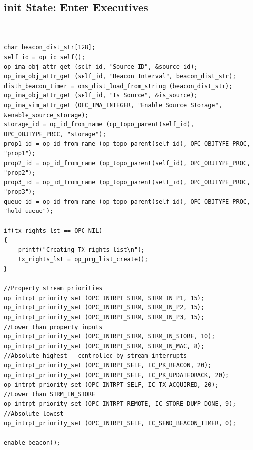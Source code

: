 \subsection{init State: Enter Executives}
{\tiny
\begin{verbatim}


char beacon_dist_str[128];
self_id = op_id_self();
op_ima_obj_attr_get (self_id, "Source ID", &source_id);
op_ima_obj_attr_get (self_id, "Beacon Interval", beacon_dist_str);
disth_beacon_timer = oms_dist_load_from_string (beacon_dist_str);
op_ima_obj_attr_get (self_id, "Is Source", &is_source);
op_ima_sim_attr_get (OPC_IMA_INTEGER, "Enable Source Storage", &enable_source_storage);
storage_id = op_id_from_name (op_topo_parent(self_id), OPC_OBJTYPE_PROC, "storage");
prop1_id = op_id_from_name (op_topo_parent(self_id), OPC_OBJTYPE_PROC, "prop1");
prop2_id = op_id_from_name (op_topo_parent(self_id), OPC_OBJTYPE_PROC, "prop2");
prop3_id = op_id_from_name (op_topo_parent(self_id), OPC_OBJTYPE_PROC, "prop3");
queue_id = op_id_from_name (op_topo_parent(self_id), OPC_OBJTYPE_PROC, "hold_queue");

if(tx_rights_lst == OPC_NIL)
{
	printf("Creating TX rights list\n");
	tx_rights_lst = op_prg_list_create();
}

//Property stream priorities
op_intrpt_priority_set (OPC_INTRPT_STRM, STRM_IN_P1, 15);
op_intrpt_priority_set (OPC_INTRPT_STRM, STRM_IN_P2, 15);
op_intrpt_priority_set (OPC_INTRPT_STRM, STRM_IN_P3, 15);
//Lower than property inputs
op_intrpt_priority_set (OPC_INTRPT_STRM, STRM_IN_STORE, 10);
op_intrpt_priority_set (OPC_INTRPT_STRM, STRM_IN_MAC, 8);
//Absolute highest - controlled by stream interrupts
op_intrpt_priority_set (OPC_INTRPT_SELF, IC_PK_BEACON, 20);
op_intrpt_priority_set (OPC_INTRPT_SELF, IC_PK_UPDATEORACK, 20);
op_intrpt_priority_set (OPC_INTRPT_SELF, IC_TX_ACQUIRED, 20);
//Lower than STRM_IN_STORE
op_intrpt_priority_set (OPC_INTRPT_REMOTE, IC_STORE_DUMP_DONE, 9);
//Absolute lowest
op_intrpt_priority_set (OPC_INTRPT_SELF, IC_SEND_BEACON_TIMER, 0);

enable_beacon();

\end{verbatim}
}

